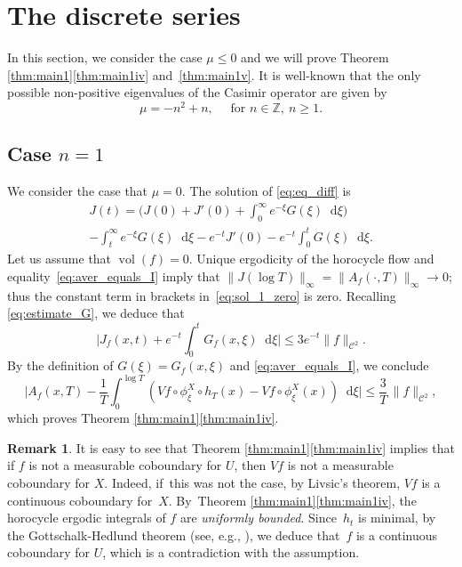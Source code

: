 \documentclass[JEP,XML,SOM,NoEqCountersInSection,Unicode,published]{cedram}
\newcommand \Z{\mathbb{Z}}
\newcommand*{\diff}{\mathop{}\!\mathrm{d}}
\newcommand{\aver}[1]{A_{#1}(x,T)}
\DeclareMathOperator{\vol}{vol}
\theoremstyle{definition}
\newtheorem{remark}[theorem]{Remark}
\begin{document}
\section{The discrete series}\label{section:discrete_ser}

In this section, we consider the case $\mu \leq 0$ and we will prove Theorem \ref{thm:main1}\eqref{thm:main1iv} and~\eqref{thm:main1v}. It is well-known \cite{Bar} that the only possible non-positive eigenvalues of the Casimir operator are given by
\[
\mu = -n^2+n, \quad \text{ for }n \in \Z,\ n \geq 1.
\]

\subsection{Case $n=1$}
We consider the case that $\mu = 0$. The solution of \eqref{eq:eq_diff} is
\begin{multline}\label{eq:sol_1_zero}
J(t) = \biggl(J(0) + J'(0) + \int_0^\infty e^{-\xi}G(\xi) \diff \xi \biggr)\\
- \int_t^\infty e^{-\xi}G(\xi) \diff \xi - e^{-t} J'(0) - e^{-t}\int_0^t G(\xi) \diff \xi.
\end{multline}
Let us assume that $\vol(f)=0$. Unique ergodicity of the horocycle flow and equality~\eqref{eq:aver_equals_I} imply that $\|J(\log T) \|_\infty = \|A_f(\cdot, T) \|_\infty \to 0$; thus the constant term in brackets in~\eqref{eq:sol_1_zero} is zero.
Recalling \eqref{eq:estimate_G}, we deduce that
\[
\biggl\lvert J_f(x,t) + e^{-t}\int_0^t G_f(x,\xi) \diff \xi \biggr\rvert \leq 3 e^{-t} \|f\|_{\mathscr{C}^2}.
\]
By the definition of $G(\xi) = G_f(x,\xi)$ and \eqref{eq:aver_equals_I}, we conclude
\[
\biggl\lvert \aver{f} - \frac{1}{T} \int_0^{\log T} \left(Vf \circ \phi^X_\xi \circ h_T(x) - Vf\circ \phi^X_\xi (x) \right) \diff \xi \biggr\rvert \leq \frac{3}{T}\, \|f\|_{\mathscr{C}^2},
\]
which proves Theorem \ref{thm:main1}\eqref{thm:main1iv}.

\begin{remark}\label{remark:Vf_cob}
It is easy to see that Theorem \ref{thm:main1}\eqref{thm:main1iv} implies that if $f$ is not a measurable coboundary for $U$, then $Vf$ is not a measurable coboundary for $X$. Indeed, if~this was not the case, by Livsic's theorem, $Vf$ is a continuous coboundary for~$X$. By~Theorem \ref{thm:main1}\eqref{thm:main1iv}, the horocycle ergodic integrals of $f$ are \emph{uniformly bounded}. Since~$h_t$ is minimal, by the Gottschalk-Hedlund theorem (see, e.g., \cite[Th.\,C]{McC}), we deduce that~$f$ is a continuous coboundary for $U$, which is a contradiction with the assumption.
\end{remark}
\end{document}
